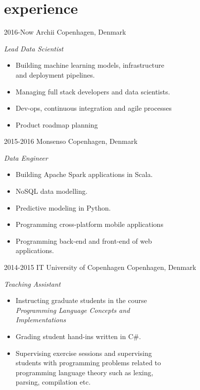 \documentclass[]{friggeri-cv} %
\begin{document}

\section{experience}

\begin{entrylist}
\entry
{2016-Now}
{Archii}
{Copenhagen, Denmark}
{\emph{Lead Data Scientist}
\begin{itemize}
	\item Building machine learning models, infrastructure\\and deployment pipelines.
	\item Managing full stack developers and data scientists.
	\item Dev-ops, continuous integration and agile processes
	\item Product roadmap planning
\end{itemize}}
\entry
{2015-2016}
{Monsenso}
{Copenhagen, Denmark}
{\emph{Data Engineer}
\begin{itemize}
	\item Building Apache Spark applications in Scala.
	\item NoSQL data modelling.
	\item Predictive modeling in Python.
	\item Programming cross-platform mobile applications
	\item Programming back-end and front-end of web\\applications.
\end{itemize}}
\entry
{2014-2015}
{IT University of Copenhagen}
{Copenhagen, Denmark}
{\emph{Teaching Assistant}
\begin{itemize}
	\item Instructing graduate students in the course \\\emph{Programming Language Concepts and\\Implementations}
	\item Grading student hand-ins written in C\#.
	\item Supervising exercise sessions and supervising\\students with programming problems related to\\programming language theory such as lexing,\\parsing, compilation etc.

\end{itemize}}
\end{entrylist}
\end{document}
